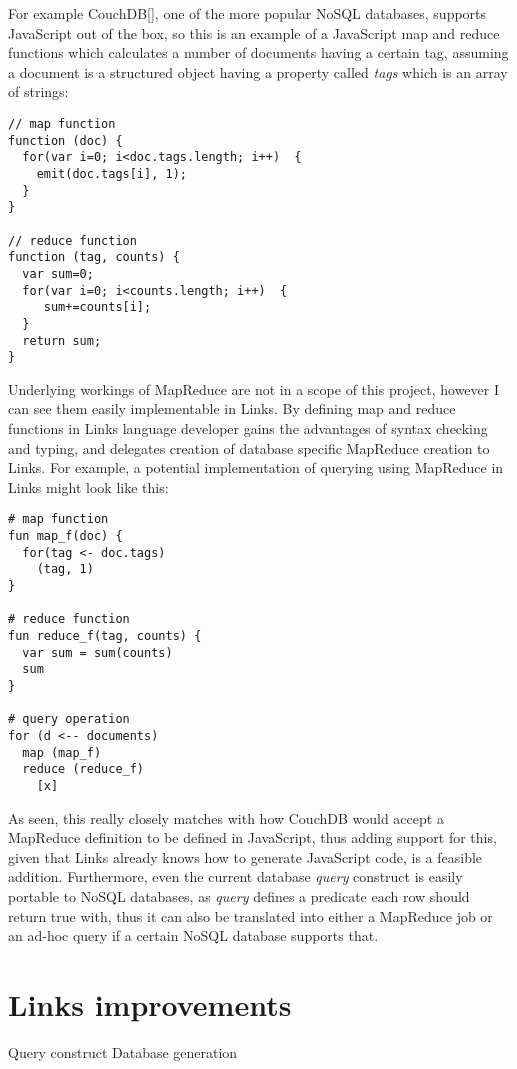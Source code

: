 For example CouchDB[], one of the more popular NoSQL databases, supports JavaScript out of the box, so this is an example of a JavaScript map and reduce functions which calculates a number of documents having a certain tag, assuming a document is a structured object having a property called \textit{tags} which is an array of strings:

\begin{codelisting}
\begin{verbatim}
// map function
function (doc) { 
  for(var i=0; i<doc.tags.length; i++)  {
    emit(doc.tags[i], 1); 
  }
}

// reduce function
function (tag, counts) {
  var sum=0; 
  for(var i=0; i<counts.length; i++)  {
     sum+=counts[i];
  }
  return sum; 
}
\end{verbatim}
\end{codelisting}

Underlying workings of MapReduce are not in a scope of this project, however I can see them easily implementable in Links. By defining map and reduce functions in Links language developer gains the advantages of syntax checking and typing, and delegates creation of database specific MapReduce creation to Links. For example, a potential implementation of querying using MapReduce in Links might look like this:

\begin{codelisting}
\begin{verbatim}
# map function
fun map_f(doc) {
  for(tag <- doc.tags)
    (tag, 1)
}

# reduce function
fun reduce_f(tag, counts) {
  var sum = sum(counts)
  sum
}

# query operation
for (d <-- documents)
  map (map_f)
  reduce (reduce_f)
    [x]
\end{verbatim}
\end{codelisting}

As seen, this really closely matches with how CouchDB would accept a MapReduce definition to be defined in JavaScript, thus adding support for this, given that Links already knows how to generate JavaScript code, is a feasible addition. Furthermore, even the current database \textit{query} construct is easily portable to NoSQL databases, as \textit{query} defines a predicate each row should return true with, thus it can also be translated into either a MapReduce job or an ad-hoc query if a certain NoSQL database supports that.

\section{Links improvements}

Query construct
Database generation